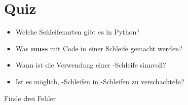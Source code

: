 \section{Quiz}
\begin{frame}
	\slidehead
	\pause
	\begin{itemize}
		\item Welche Schleifenarten gibt es in Python?\pause
		\item Was \textbf{muss} mit Code in einer Schleife gemacht werden?\pause
		\item Wann ist die Verwendung einer -Schleife sinnvoll?\pause
		\item Ist es möglich, -Schleifen in -Schleifen zu verschachteln?\pause
	\end{itemize}

	\begin{block}{Finde drei Fehler}
	\end{block}
\end{frame}


